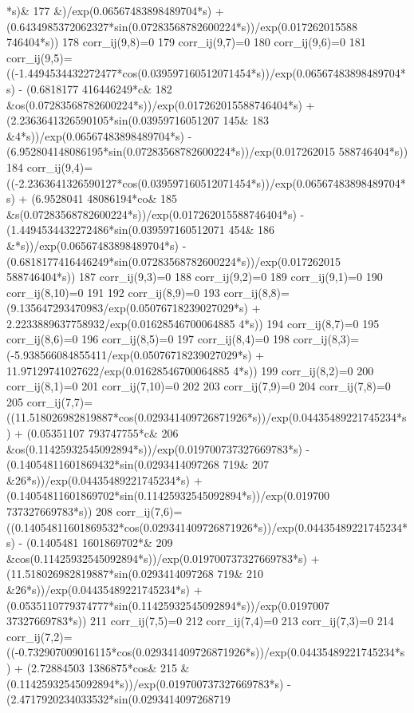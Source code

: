 \begin{DoxyCode}
      *s)&
177          &)/exp(0.06567483898489704*s) + (0.6434985372062327*sin(0.07283568782600224*s))/exp(0.017262015588
      746404*s)) 
178     corr\_ij(9,8)=0
179     corr\_ij(9,7)=0
180     corr\_ij(9,6)=0
181     corr\_ij(9,5)=((-1.4494534432272477*cos(0.039597160512071454*s))/exp(0.06567483898489704*s) - (0.6818177
      416446249*c&
182          &os(0.07283568782600224*s))/exp(0.017262015588746404*s) + (2.2363641326590105*sin(0.03959716051207
      145&
183          &4*s))/exp(0.06567483898489704*s) - (6.952804148086195*sin(0.07283568782600224*s))/exp(0.017262015
      588746404*s)) 
184     corr\_ij(9,4)=((-2.2363641326590127*cos(0.039597160512071454*s))/exp(0.06567483898489704*s) + (6.9528041
      48086194*co&
185          &s(0.07283568782600224*s))/exp(0.017262015588746404*s) - (1.4494534432272486*sin(0.039597160512071
      454&
186          &*s))/exp(0.06567483898489704*s) - (0.6818177416446249*sin(0.07283568782600224*s))/exp(0.017262015
      588746404*s)) 
187     corr\_ij(9,3)=0
188     corr\_ij(9,2)=0
189     corr\_ij(9,1)=0
190     corr\_ij(8,10)=0
191 
192     corr\_ij(8,9)=0
193     corr\_ij(8,8)=(9.135647293470983/exp(0.05076718239027029*s) + 2.2233889637758932/exp(0.01628546700064885
      4*s)) 
194     corr\_ij(8,7)=0
195     corr\_ij(8,6)=0
196     corr\_ij(8,5)=0
197     corr\_ij(8,4)=0
198     corr\_ij(8,3)=(-5.938566084855411/exp(0.05076718239027029*s) + 11.97129741027622/exp(0.01628546700064885
      4*s)) 
199     corr\_ij(8,2)=0
200     corr\_ij(8,1)=0
201     corr\_ij(7,10)=0
202 
203     corr\_ij(7,9)=0
204     corr\_ij(7,8)=0
205     corr\_ij(7,7)=((11.518026982819887*cos(0.029341409726871926*s))/exp(0.04435489221745234*s) + (0.05351107
      793747755*c&
206          &os(0.11425932545092894*s))/exp(0.019700737327669783*s) - (0.14054811601869432*sin(0.0293414097268
      719&
207          &26*s))/exp(0.04435489221745234*s) + (0.14054811601869702*sin(0.11425932545092894*s))/exp(0.019700
      737327669783*s)) 
208     corr\_ij(7,6)=((0.14054811601869532*cos(0.029341409726871926*s))/exp(0.04435489221745234*s) - (0.1405481
      1601869702*&
209          &cos(0.11425932545092894*s))/exp(0.019700737327669783*s) + (11.518026982819887*sin(0.0293414097268
      719&
210          &26*s))/exp(0.04435489221745234*s) + (0.0535110779374777*sin(0.11425932545092894*s))/exp(0.0197007
      37327669783*s)) 
211     corr\_ij(7,5)=0
212     corr\_ij(7,4)=0
213     corr\_ij(7,3)=0
214     corr\_ij(7,2)=((-0.732907009016115*cos(0.029341409726871926*s))/exp(0.04435489221745234*s) + (2.72884503
      1386875*cos&
215          &(0.11425932545092894*s))/exp(0.019700737327669783*s) - (2.4717920234033532*sin(0.0293414097268719

\end{DoxyCode}
